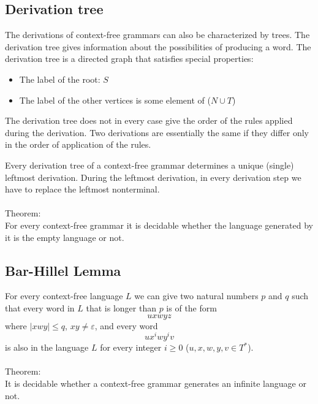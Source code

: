 \documentclass[margin=0px]{article}
\begin{document}
\subsection{Derivation tree}
The derivations of context-free grammars can also be characterized by trees. The derivation tree gives information about the possibilities of producing a word. The derivation tree is a directed graph that satisfies special properties:
\begin{itemize}
    \item The label of the root: $S$
    \item The label of the other vertices is some element of ($N\cup T$)
\end{itemize}
The derivation tree does not in every case give the order of the rules applied during the derivation. Two derivations are essentially the same if they differ only in the order of application of the rules.

Every derivation tree of a context-free grammar determines a unique (single) leftmost derivation. During the leftmost derivation, in every derivation step we have to replace the leftmost nonterminal.
\\\\
Theorem:\\
For every context-free grammar it is decidable whether the language generated by it is the empty language or not.
\subsection{Bar-Hillel Lemma}
For every context-free language $L$ we can give two natural numbers $p$ and $q$ such that every word in $L$ that is longer than $p$ is of the form
\[uxwyz\]
where $|xwy| \leq q$, $xy \neq \varepsilon$, and every word
\[ux^iwy^iv\]
is also in the language $L$ for every integer $i \geq 0$ ($u,x,w,y,v \in T^*$).
\\\\
Theorem:\\
It is decidable whether a context-free grammar generates an infinite language or not.
\end{document}
